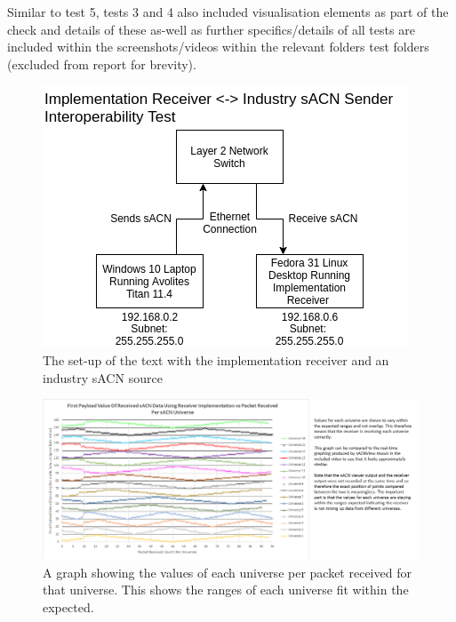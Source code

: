 \documentclass[11pt,a4paper]{article}
\begin{document}
Similar to test 5, tests 3 and 4 also included visualisation elements as part of the check and details of these as-well as further specifics/details of all tests are included within the screenshots/videos within the relevant folders test folders (excluded from report for brevity).\\

\begin{figure}[H]
	\includegraphics[width=\textwidth]{CS4099-Avo-setup.png}
	\caption{The set-up of the text with the implementation receiver and an industry sACN source}
	\label{AVO_SETUP}
\end{figure}

\begin{figure}[H]
	\begin{turn}{90}
		\begin{minipage}[c][\textwidth][c]{\textheight}
			\centering
			\includegraphics[width=\textwidth]{test-5-processed-first-value-chart}
			\caption{A graph showing the values of each universe per packet received for that universe. This shows the ranges of each universe fit within the expected.}
			\label{RCV_INTEROP_TEST_5_GRAPH}
		\end{minipage}
	\end{turn}
\end{figure}
\end{document}
